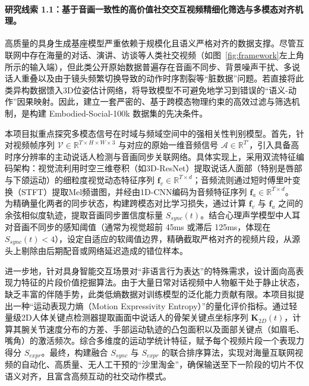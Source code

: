 \paragraph{\textbf{研究线索 1.1：基于音画一致性的高价值社交交互视频精细化筛选与多模态对齐机理。}}

高质量的具身生成基座模型严重依赖于规模化且语义严格对齐的数据支撑。尽管互联网中存在海量的对话、演讲、访谈等人类社交视频（如图~\ref{fig:framework}左上角所示的输入端），但此类公开原始数据普遍存在音画不同步、背景噪声干扰、多说话人重叠以及由于镜头频繁切换导致的动作时序割裂等“脏数据”问题。若直接将此类异构数据馈入3D位姿估计网络，将导致模型不可避免地学习到错误的“语义-动作”因果映射。因此，建立一套严密的、基于跨模态物理约束的高效过滤与筛选机制，是构建 Embodied-Social-100k 数据集的先决条件。

本项目拟重点探究多模态信号在时域与频域空间中的强相关性判别模型。首先，针对视频帧序列 $\mathcal{V} \in \mathbb{R}^{T \times H \times W \times 3}$ 与对应的原始一维音频信号 $\mathcal{A} \in \mathbb{R}^{T'}$，引入具备高时序分辨率的主动说话人检测\cite{Tao2021IsSS}与音画同步关联网络\cite{Raina2022SyncNetCO}。具体实现上，采用双流特征编码架构：视觉流利用时空三维卷积（如3D-ResNet）提取说话人面部（特别是唇部与下颌运动）的细粒度视觉动态特征序列 $\mathbf{f}_{v} \in \mathbb{R}^{T \times d}$；音频流则通过短时傅里叶变换（STFT）提取Mel频谱图，并经由1D-CNN编码为音频特征序列 $\mathbf{f}_{a} \in \mathbb{R}^{T \times d}$。
为精确量化两者的同步状态，构建跨模态对比学习损失，通过计算 $\mathbf{f}_{v}$ 与 $\mathbf{f}_{a}$ 之间的余弦相似度轨迹，提取音画同步置信度标量 $S_{sync}(t)$。结合心理声学模型中人耳对音画不同步的感知阈值（通常为视觉超前 45ms 或滞后 125ms，体现在$S_{sync}(t)<4$），设定自适应的软阈值边界，精确截取严格对齐的视频片段，从源头上剔除由后期配音或网络延迟造成的错位样本。

进一步地，针对具身智能交互场景对“非语言行为表达”的特殊需求，设计面向高表现力特征的片段价值挖掘算法。由于大量日常对话视频中人物躯干处于静止状态，缺乏丰富的伴随手势，此类低熵数据对训练模型的泛化能力贡献有限。本项目拟提出一种“运动表现力熵（Motion Expressivity Entropy）”的量化评价指标。通过轻量级2D人体关键点检测器提取画面中说话人的骨架关键点坐标序列 $\mathbf{K}_{2D}(t)$，计算其腕关节速度分布的方差、手部运动轨迹的凸包面积以及面部关键点（如眉毛、嘴角）的激活频次。综合多维度的运动学统计特征，赋予每个视频片段一个表现力得分 $S_{expr}$。最终，构建融合 $S_{sync}$ 与 $S_{expr}$ 的联合排序算法，实现对海量互联网视频的自动化、高质量、无人工干预的“沙里淘金”，确保输送至下一阶段的切片不仅语义对齐，且富含高频互动的社交动作模式。


